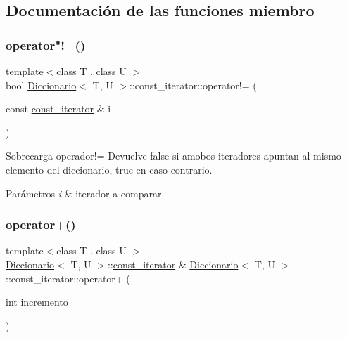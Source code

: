 \subsection{Documentación de las funciones miembro}
\mbox{\label{classDiccionario_1_1const__iterator_a5239fb7bff61e8ffb771355f18ea03a9}} 
\subsubsection{\texorpdfstring{operator"!=()}{operator!=()}}
{\footnotesize\ttfamily template$<$class T , class U $>$ \\
bool \hyperlink{classDiccionario}{Diccionario}$<$ T, U $>$\+::const\+\_\+iterator\+::operator!= (\begin{DoxyParamCaption}\item[{const \hyperlink{classDiccionario_1_1const__iterator}{const\+\_\+iterator} \&}]{i }\end{DoxyParamCaption})}



Sobrecarga operador!= Devuelve false si amobos iteradores apuntan al mismo elemento del diccionario, true en caso contrario. 


\begin{DoxyParams}{Parámetros}
{\em i} & iterador a comparar \\
\hline
\end{DoxyParams}
\mbox{\label{classDiccionario_1_1const__iterator_a080e1da79c76b17480b3ff8ed298ae89}} 
\subsubsection{\texorpdfstring{operator+()}{operator+()}}
{\footnotesize\ttfamily template$<$class T , class U $>$ \\
\hyperlink{classDiccionario}{Diccionario}$<$ T, U $>$\+::\hyperlink{classDiccionario_1_1const__iterator}{const\+\_\+iterator} \& \hyperlink{classDiccionario}{Diccionario}$<$ T, U $>$\+::const\+\_\+iterator\+::operator+ (\begin{DoxyParamCaption}\item[{int}]{incremento }\end{DoxyParamCaption})}



